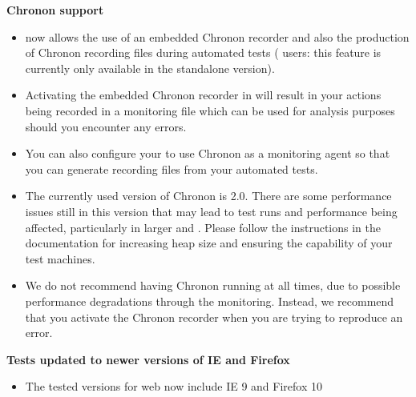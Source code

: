 \textbf{Chronon support}
\begin{itemize}
\item \app{} now allows the use of an embedded Chronon recorder and also the production of Chronon recording files during automated tests (\jb{} users: this feature is currently only available in the standalone version). 
\item Activating the embedded Chronon recorder in \app{} will result in your actions being recorded in a monitoring file which can be used for analysis purposes should you encounter any errors.
\item You can also configure your \gdaut{} to use Chronon as a monitoring agent so that you can generate recording files from your automated tests. 
\item The currently used version of Chronon is 2.0. There are some performance issues still in this version that may lead to test runs and performance being affected, particularly in larger \gdauts{} and \gdprojects{}. Please follow the instructions in the documentation for increasing heap size and ensuring the capability of your test machines. 
\item We do not recommend having Chronon running at all times, due to possible performance degradations through the monitoring. Instead, we recommend that you activate the Chronon recorder when you are trying to reproduce an error.
\end{itemize}

\textbf{Tests updated to newer versions of IE and Firefox}
\begin{itemize}
\item The tested versions for web \gdauts{} now include IE 9 and Firefox 10
\end{itemize}


